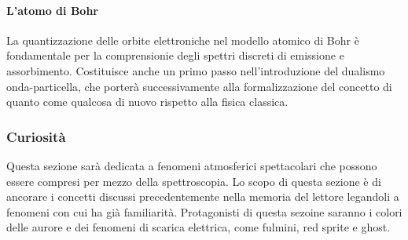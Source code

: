 \documentclass[12pt,a4paper]{report}
\begin{document}
\paragraph{L'atomo di Bohr} La quantizzazione delle orbite elettroniche nel modello atomico di Bohr è fondamentale per la comprensionie degli spettri discreti di emissione e assorbimento. Costituisce anche un primo passo nell'introduzione del dualismo onda-particella, che porterà successivamente alla formalizzazione del concetto di quanto come qualcosa di nuovo rispetto alla fisica classica.

\subsubsection{Curiosità}

Questa sezione sarà dedicata a fenomeni atmosferici spettacolari che possono essere compresi per mezzo della spettroscopia. Lo scopo di questa sezione è di ancorare i concetti discussi precedentemente nella memoria del lettore legandoli a fenomeni con cui ha già familiarità. Protagonisti di questa sezoine saranno i colori delle aurore e dei fenomeni di scarica elettrica, come fulmini, red sprite e ghost.

\newpage

\printbibliography
\end{document}
